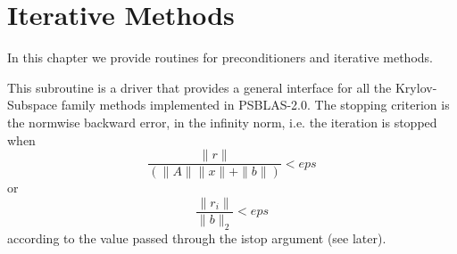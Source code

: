 \section{Iterative Methods}
\label{sec:methods}

In this chapter we provide routines for preconditioners and iterative
methods. 

%
%


This subroutine is a driver that provides a general interface for all
the Krylov-Subspace family methods implemented in PSBLAS-2.0. The
stopping criterion is the normwise backward error, in the infinity
norm, i.e. the iteration is stopped when 
\[ \frac{\|r\|}{(\|A\|\|x\|+\|b\|)} < eps \]
or
\[ \frac{\|r_i\|}{\|b\|_2} < eps \]
according to the value passed through the  istop argument (see later).



